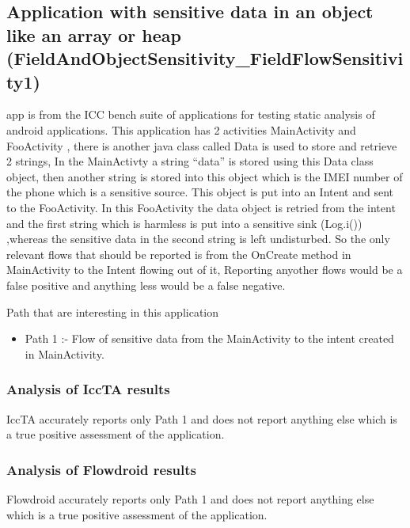 \documentclass[journal]{IEEEtran}
\begin{document}
\subsection{Application with sensitive data in an object like an array or heap (FieldAndObjectSensitivity\_FieldFlowSensitivity1)}
% 
% 
% 
% 
 app is from the ICC bench suite of applications for testing static analysis of android applications. This application has 2 activities MainActivity and FooActivity , there is another java class called Data is used to store and retrieve 2 strings, In the MainActivty a string ``data''  is stored using this Data class object, then another string is stored into this object which is the IMEI number of the phone which is a sensitive source. This object is put into an Intent and sent to the FooActivity. In this FooActivity the data object is retried from the intent and the first string which is harmless is put into a sensitive sink (Log.i()) ,whereas the sensitive data in the second string is left undisturbed. So the only relevant flows that should be reported is from the OnCreate method in MainActivity to the Intent flowing out of it, Reporting anyother flows would be a false positive and anything less would be a false negative.

Path that are interesting in this application
\begin{itemize}
	\item Path 1 :-  Flow of sensitive data from the MainActivity to the intent created in MainActivity.
\end{itemize}

\subsubsection{Analysis of IccTA results}
IccTA accurately reports only Path 1 and does not report anything else which is a true positive assessment of the application.
\subsubsection{Analysis of Flowdroid results}
Flowdroid accurately reports only Path 1 and does not report anything else which is a true positive assessment of the application.
\end{document}
